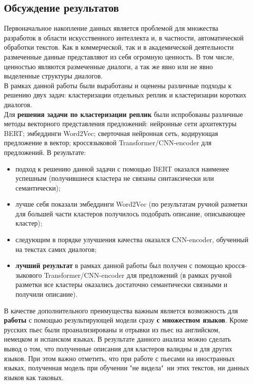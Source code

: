 \documentclass[a4paper,14pt]{article}
\begin{document}
\begin{center}
	\section*{Обсуждение результатов}	
\end{center}
\begin{justify}

\indent
Первоначальное накопление данных является проблемой для множества разработок в области искусственного интеллекта и, в частности, автоматической обработки текстов. Как в коммерческой, так и в академической деятельности размеченные данные представляют из себя огромную ценность. В том числе, ценностью являются размеченные диалоги, а так же явно или не явно выделенные структуры диалогов. \cite{survey}\\
\indent
В рамках данной работы были выработаны и оценены различные подходы к решению двух задач: кластеризации отдельных реплик и кластеризации коротких диалогов. \\
\indent
Для \textbf{решения задачи по кластеризации реплик} были испробованы различные методы векторного представления предложений: нейронные сети архитектуры BERT; эмбеддинги Word2Vec; сверточная нейронная сеть, кодирующая предложение в вектор; кросс­языковой Transformer/CNN­-encoder для предложений. В результате:
\begin{itemize}
  \item подход к решению данной задачи с помощью BERT оказался наименее успешным (получившиеся кластера не связаны синтаксически или семантически); 
  \item лучше себя показали эмбеддинги Word2Vec (по результатам ручной разметки для большей части кластеров получилось подобрать описание, описывающее кластер);
  \item следующим в порядке улучшения качества оказался СNN-encoder, обученный на текстах самих диалогов;
  \item \textbf{лучший результат} в рамках данной работы был получен с помощью кросс­я-зыкового Transformer/CNN­-encoder для предложений (в рамках ручной разметки все кластеры оказались достаточно семантически связными и получили описание).
 \end{itemize}
\indent
В качестве дополнительного преимущества важным является возможность для \textbf{работы} с помощью результирующей модели сразу \textbf{с множеством языков}. Кроме русских пьес были проанализированы и отрывки из пьес на английском, немецком и испанском языках. В результате данного анализа можно сделать вывод о том, что полученные описания для кластеров валидны и для других языков. При этом важно отметить, что при работе с пьесами на иностранных языках, полученная модель при обучении "не видела"\ ни этих текстов, ни данных языков как таковых. \\

\end{justify}
\end{document}
